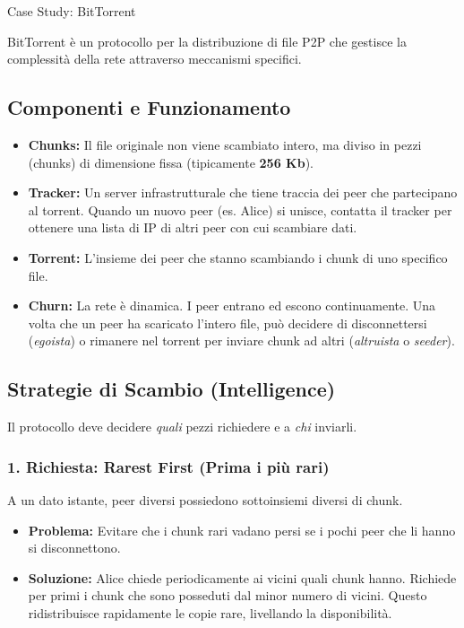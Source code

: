 \documentclass[a4paper,12pt]{report}
\begin{document}
\begin{esempiobox}{Case Study: BitTorrent}

BitTorrent è un protocollo per la distribuzione di file P2P che gestisce la complessità della rete attraverso meccanismi specifici.

\subsection*{Componenti e Funzionamento}
\begin{itemize}
    \item \textbf{Chunks:} Il file originale non viene scambiato intero, ma diviso in pezzi (chunks) di dimensione fissa (tipicamente \textbf{256 Kb}).
    \item \textbf{Tracker:} Un server infrastrutturale che tiene traccia dei peer che partecipano al torrent. Quando un nuovo peer (es. Alice) si unisce, contatta il tracker per ottenere una lista di IP di altri peer con cui scambiare dati.
    \item \textbf{Torrent:} L'insieme dei peer che stanno scambiando i chunk di uno specifico file.
    \item \textbf{Churn:} La rete è dinamica. I peer entrano ed escono continuamente. Una volta che un peer ha scaricato l'intero file, può decidere di disconnettersi (\textit{egoista}) o rimanere nel torrent per inviare chunk ad altri (\textit{altruista} o \textit{seeder}).
\end{itemize}

\subsection*{Strategie di Scambio (Intelligence)}
Il protocollo deve decidere \textit{quali} pezzi richiedere e a \textit{chi} inviarli.

\subsubsection*{1. Richiesta: Rarest First (Prima i più rari)}
A un dato istante, peer diversi possiedono sottoinsiemi diversi di chunk.
\begin{itemize}
    \item \textbf{Problema:} Evitare che i chunk rari vadano persi se i pochi peer che li hanno si disconnettono.
    \item \textbf{Soluzione:} Alice chiede periodicamente ai vicini quali chunk hanno. Richiede per primi i chunk che sono posseduti dal minor numero di vicini. Questo ridistribuisce rapidamente le copie rare, livellando la disponibilità.
\end{itemize}


\end{esempiobox}
\end{document}
